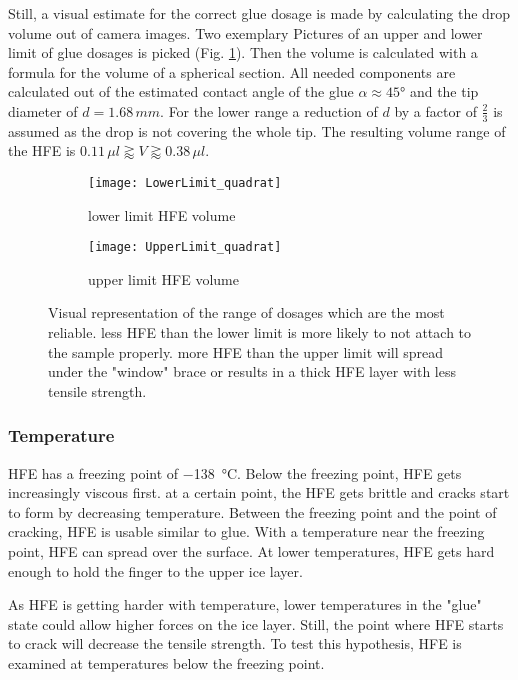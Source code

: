 Still, a visual estimate for the correct glue dosage is made by calculating the drop volume out of camera images. Two exemplary Pictures of an upper and lower limit of glue dosages is picked (Fig. \ref{fig:rangeHFE}). Then the volume is calculated with a formula for the volume of a spherical section. All needed components are calculated out of the estimated contact angle of the glue $\alpha \approx 45°$ and the tip diameter of $d = 1.68\,mm$. For the lower range a reduction of $d$ by a factor of $\frac{2}{3}$ is assumed as the drop is not covering the whole tip. The resulting volume range of the HFE is $ 0.11\,\mu l \gtrapprox V \gtrapprox 0.38\,\mu l $.

\begin{figure}[hbt!]
	\centering
	\begin{subfigure}[]{0.45\textwidth}
		\centering
		\texttt{[image: LowerLimit\_quadrat]}
		\caption{lower limit HFE volume}
	\end{subfigure}
	\begin{subfigure}[]{0.45\textwidth}
		\centering
		\texttt{[image: UpperLimit\_quadrat]}
		\caption{upper limit HFE volume}
	\end{subfigure}
	\caption{Visual representation of the range of dosages which are the most reliable. less HFE than the lower limit is more likely to not attach to the sample properly. more HFE than the upper limit will spread under the "window" brace or results in a thick HFE layer with less tensile strength.}
	\label{fig:rangeHFE}
\end{figure}

\subsubsection{Temperature}

HFE has a freezing point of \SI{-138}{\degreeCelsius}. Below the freezing point, HFE gets increasingly viscous first. at a certain point, the HFE gets brittle and cracks start to form by decreasing temperature. Between the freezing point and the point of cracking, HFE is usable similar to glue. With a temperature near the freezing point, HFE can spread over the surface. At lower temperatures, HFE gets hard enough to hold the finger to the upper ice layer.

As HFE is getting harder with temperature, lower temperatures in the "glue" state could allow higher forces on the ice layer. Still, the point where HFE starts to crack will decrease the tensile strength. To test this hypothesis, HFE is examined at temperatures below the freezing point.

